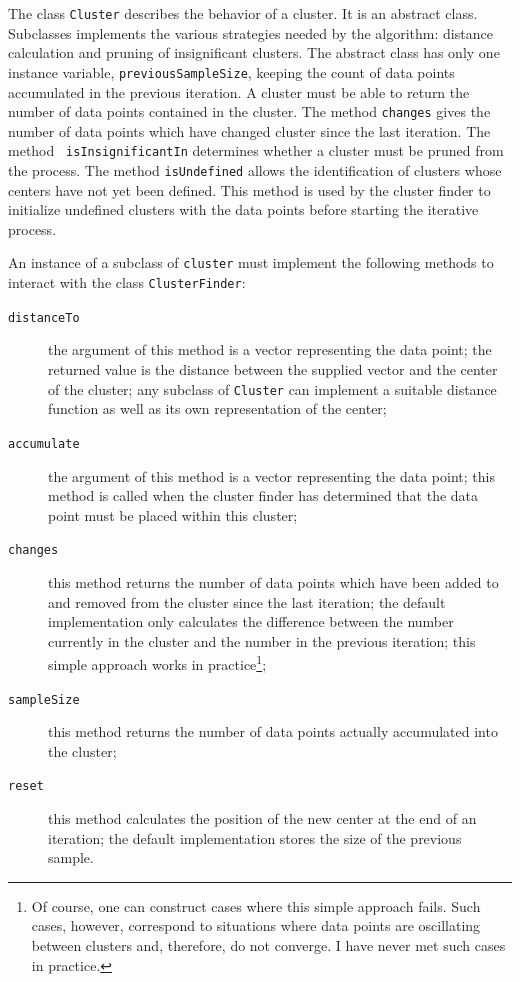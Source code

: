 \documentclass[twoside]{book}
\begin{document}
The class {\tt Cluster} describes the behavior of a cluster. It is
an abstract class. Subclasses implements the various strategies
needed by the algorithm: distance calculation and pruning of
insignificant clusters. The abstract class has only one instance
variable, {\tt previousSampleSize}, keeping the count of data
points accumulated in the previous iteration. A cluster must be
able to return the number of data points contained in the cluster.
The method {\tt changes} gives the number of data points which
have changed cluster since the last iteration. The method {\tt
isInsignificantIn} determines whether a cluster must be pruned
from the process. The method {\tt isUndefined} allows the
identification of clusters whose centers have not yet been
defined. This method is used by the cluster finder to initialize
undefined clusters with the data points before starting the
iterative process.

An instance of a subclass of {\tt cluster} must implement the
following methods to interact with the class {\tt ClusterFinder}:
\begin{description}
  \item[\tt distanceTo] the argument of this method is a vector
  representing the data point; the returned value is the distance
  between the supplied vector and the center of the cluster; any
  subclass of {\tt Cluster} can implement a suitable distance function
  as well as its own representation of the center;
  \item[\tt accumulate] the argument of this method is a vector
  representing the data point; this method is called when the
  cluster finder has determined that the data point must be placed
  within this cluster;
  \item[\tt changes] this method returns the number of data points
  which have been added to and removed from the cluster since the
  last iteration; the default implementation only calculates the
  difference between the number currently in the cluster and the
  number in the previous iteration; this simple approach works in
  practice\footnote{Of course, one can construct cases where this
  simple approach fails. Such cases, however, correspond to
  situations where data points are oscillating between clusters
  and, therefore, do not converge. I have never met such cases in practice.};
  \item[\tt sampleSize] this method returns the number of data
  points actually accumulated into the cluster;
  \item[\tt reset] this method calculates the position of the new
  center at the end of an iteration; the default implementation
  stores the size of the previous sample.
\end{description}
\end{document}
